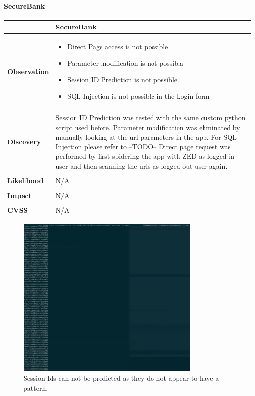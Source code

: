 \paragraph{SecureBank} \mbox{}
\begin{longtable*}{p{.20\textwidth} | p{.80\textwidth}}
    \hline
    & \textbf{SecureBank} \\ 
    \hline
    \textbf{Observation} &
        \begin{itemize}
		  \item Direct Page access is not possible
		  \item Parameter modification is not possibla
		  \item Session ID Prediction is not possible
		  \item SQL Injection is not possible in the Login form
		\end{itemize}
    \\\\
    \textbf{Discovery} &
    	Session ID Prediction was tested with the same custom python script used before. \newline
        Parameter modification was eliminated by manually looking at the url parameters in the app. \newline
        For SQL Injection please refer to --TODO-- \newline
        Direct page request was performed by first spidering the app with ZED as logged in user and then scanning the urls as logged out user again. \newline
    \\\\
    \textbf{Likelihood} &
       N/A
    \\\\
    \textbf{Impact} &
        N/A
    \\\\
    \textbf{CVSS} &
        N/A
    \\
    \hline
\end{longtable*}
\begin{figure}[p]
    \centering
    \includegraphics[width=0.8\textwidth]{figures/OTG-AUTHN-004-1.jpg}
    \caption{Session Ids can not be predicted as they do not appear to have a pattern.}
    \label{fig:OTG_AUTHN_004_1}
\end{figure}
\clearpage